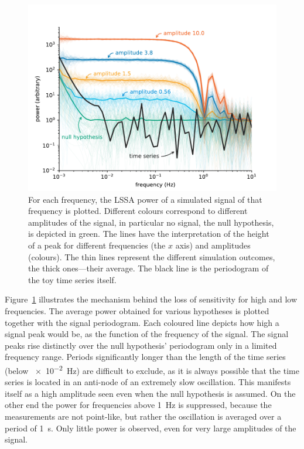 \begin{figure}
  \centering \includegraphics[width=\linewidth]{gfx/axions/basic_exclusion_sensitivity.pdf}
  \caption{For each frequency, the LSSA power of a simulated signal of that frequency is plotted. Different colours correspond to different amplitudes of the signal, in particular no signal, the null hypothesis, is depicted in green. The lines have the interpretation of the height of a peak for different frequencies (the $x$ axis) and amplitudes (colours). The thin lines represent the different simulation outcomes, the thick ones---their average. The black line is the periodogram of the toy time series itself.}\label{fig:sensitivity}
\end{figure}

Figure~\ref{fig:sensitivity} illustrates the mechanism behind the loss of sensitivity for high and low frequencies. The average power obtained for various hypotheses is plotted together with the signal periodogram. Each coloured line depicts how high a signal peak would be, as the function of the frequency of the signal.
The signal peaks rise distinctly over the null hypothesis' periodogram only in a limited frequency range. Periods significantly longer than the length of the time series (below \SI{e-2}{\hertz}) are difficult to exclude, as it is always possible that the time series is located in an anti-node of an extremely slow oscillation. This manifests itself as a high amplitude seen even when the null hypothesis is assumed. On the other end the power for frequencies above \SI{1}{\hertz} is suppressed, because the measurements are not point-like, but rather the oscillation is averaged over a period of \SI{1}{\second}. Only little power is observed, even for very large amplitudes of the signal.

